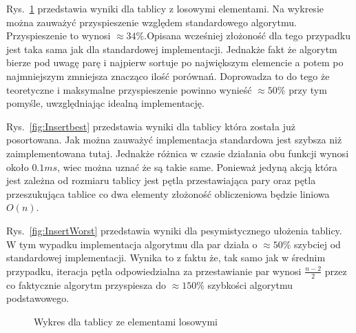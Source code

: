 \par Rys.~\ref{fig:insertRand} przedstawia wyniki dla tablicy z losowymi elementami. Na wykresie można zauważyć przyspieszenie względem standardowego algorytmu. Przyspieszenie to wynosi $ \approx 34 \% $.Opisana wcześniej złożoność dla tego przypadku jest taka sama jak dla standardowej implementacji. Jednakże fakt że algorytm bierze pod uwagę parę i najpierw sortuje po największym elemencie a potem po najmniejszym zmniejsza znacząco ilość porównań. Doprowadza to do tego że teoretyczne i maksymalne przyspieszenie powinno wynieść $ \approx 50\% $ przy tym pomyśle, uwzględniając idealną implementację.
\par Rys.~\ref{fig:Insertbest} przedstawia wyniki dla tablicy która została już posortowana. Jak można zauważyć implementacja standardowa jest szybsza niż zaimplementowana tutaj. Jednakże różnica w czasie działania obu funkcji wynosi około $0.1ms$, wiec można uznać że są takie same. Ponieważ jedyną akcją która jest zależna od rozmiaru tablicy jest pętla przestawiająca pary oraz pętla przeszukująca tablice co dwa elementy złożoność obliczeniowa będzie liniowa $O(n)$.
\par Rys.~\ref{fig:InsertWorst} przedstawia wyniki dla pesymistycznego ułożenia tablicy. W tym wypadku implementacja algorytmu dla par działa o $\approx 50 \% $ szybciej od standardowej implementacji. Wynika to z faktu że, tak samo jak w średnim przypadku, iteracja pętla odpowiedzialna za przestawianie par wynosi $\frac{n-2}{2}$ przez co faktycznie algorytm przyspiesza do $\approx 150 \% $ szybkości algorytmu podstawowego.
\begin{figure}[!h]
  \begin{center}
    \caption{Wykres dla tablicy ze elementami losowymi}\label{fig:insertRand}
  \end{center}
\end{figure}\FloatBarrier
